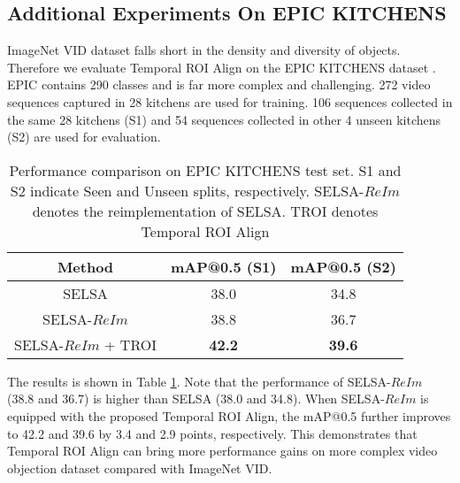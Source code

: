 \documentclass[letterpaper]{article} \usepackage{aaai21}  \usepackage{times}  \usepackage{helvet} \usepackage{courier}  \usepackage[hyphens]{url}  \usepackage{graphicx} \usepackage{hyperref}
\begin{document}
\subsection{Additional Experiments On EPIC KITCHENS}
ImageNet VID dataset falls short in the density and diversity of objects. Therefore we evaluate Temporal ROI Align on the EPIC KITCHENS dataset \cite{damen2018scaling}. EPIC contains 290 classes and is far more complex and challenging. 272 video sequences captured in 28 kitchens are used for training. 106 sequences collected in the same 28 kitchens (S1) and 54 sequences collected in other 4 unseen kitchens (S2) are used for evaluation. \begin{table}[t]
\begin{center}
\small
\begin{tabular}{c|c|c}
  \hline
  \hline
  Method & mAP@0.5 (S1) & mAP@0.5 (S2)\\
  \hline
  \hline
  SELSA \cite{wu2019sequence} & 38.0 & 34.8\\
  \hline
  SELSA-$ReIm$ & 38.8 & 36.7\\
  SELSA-$ReIm$ + TROI & \textbf{42.2} & \textbf{39.6}\\
  \hline
  \hline
\end{tabular}
\end{center}
\vspace{-0.2cm}
\caption{Performance comparison on EPIC KITCHENS test set. S1 and S2 indicate Seen and Unseen splits, respectively. SELSA-$ReIm$ denotes the reimplementation of SELSA. TROI denotes Temporal ROI Align}
\label{t:epic}
\end{table}

The results is shown in Table \ref{t:epic}. Note that the performance of SELSA-$ReIm$ (38.8 and 36.7) is higher than SELSA \cite{wu2019sequence} (38.0 and 34.8). When SELSA-$ReIm$ is equipped with the proposed Temporal ROI Align, the mAP@0.5 further improves to 42.2 and 39.6 by 3.4 and 2.9 points, respectively. This demonstrates that Temporal ROI Align can bring more performance gains on more complex video objection dataset compared with ImageNet VID.
\end{document}
